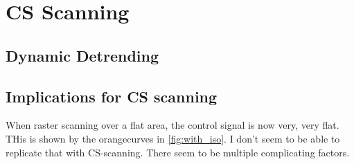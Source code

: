 \documentclass[11pt]{article}
\begin{document}
\section{CS Scanning\label{sec:CS}}
\label{sec:org7976d23}
\subsection{Dynamic Detrending \label{sec:dyn_detrend}}
\label{sec:orgb9c244d}

\subsection{Implications for CS scanning}
\label{sec:orgeb08286}
When raster scanning over a flat area, the control signal is now very, very flat. THis is shown by the orangecurves in \ref{fig:with_iso}. I don't seem to be able to replicate that with CS-scanning. There seem to be multiple complicating factors.
\end{document}
